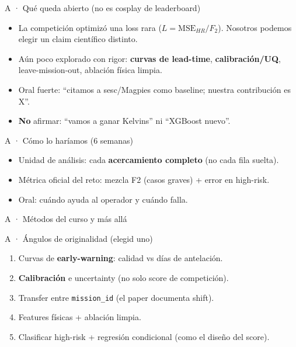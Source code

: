 \documentclass[aspectratio=169,10pt]{beamer}
\begin{document}
\begin{frame}{A · Qué queda abierto (no es cosplay de leaderboard)}
  \begin{itemize}
    \item La competición optimizó una loss rara ($L = \mathrm{MSE}_{HR}/F_2$). Nosotros podemos elegir un claim científico distinto.
    \item Aún poco explorado con rigor: \textbf{curvas de lead-time}, \textbf{calibración/UQ}, leave-mission-out, ablación física limpia.
    \item Oral fuerte: ``citamos a sesc/Magpies como baseline; nuestra contribución es X''.
    \item \textbf{No} afirmar: ``vamos a ganar Kelvins'' ni ``XGBoost nuevo''.
  \end{itemize}
\end{frame}

\begin{frame}{A · Cómo lo haríamos (6 semanas)}
  \vspace{0.35em}
  \begin{itemize}
    \item Unidad de análisis: cada \textbf{acercamiento completo} (no cada fila suelta).
    \item Métrica oficial del reto: mezcla F2 (casos graves) + error en high-risk.
    \item Oral: cuándo ayuda al operador y cuándo falla.
  \end{itemize}
\end{frame}

\begin{frame}{A · Métodos del curso y más allá}
\end{frame}

\begin{frame}{A · Ángulos de originalidad (elegid uno)}
  \begin{enumerate}
    \item Curvas de \textbf{early-warning}: calidad vs días de antelación.
    \item \textbf{Calibración} e uncertainty (no solo score de competición).
    \item Transfer entre \texttt{mission\_id} (el paper documenta shift).
    \item Features físicas + ablación limpia.
    \item Clasificar high-risk + regresión condicional (como el diseño del score).
  \end{enumerate}
\end{frame}
\end{document}
